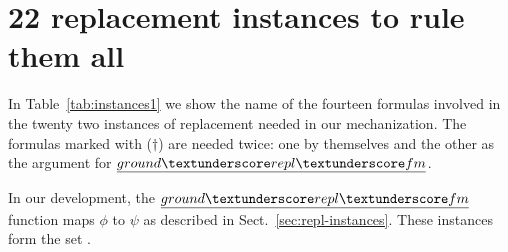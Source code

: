 \section{22 replacement instances to rule them all}
\label{sec:repl-instances-appendix}

In Table~\ref{tab:instances1} we show the name of the fourteen formulas
involved in the twenty two instances of replacement needed in our
mechanization. The formulas marked with ($\dagger$) are needed twice:
one by themselves and the other as the argument for $\isa{ground{\uscore}repl{\uscore}fm}$.

In our development, the $\isa{ground{\uscore}repl{\uscore}fm}$
function maps $\phi$ to $\psi$ as described in
Sect.~\ref{sec:repl-instances}. These instances form the set
.

\newcommand{\groundRepl}{\ensuremath{{}^\dagger}}
\newcommand{\replInstSet}[1]{\multicolumn{3}{@{}l}{\hspace{0.3em}{$\mathbf{\mathit{#1}}$}}}

